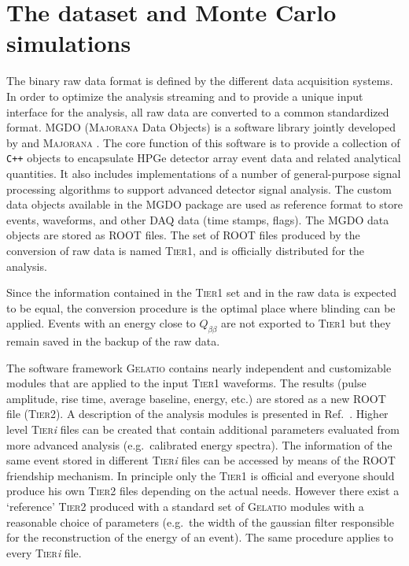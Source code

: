 \chapter{The {\gerda} dataset and Monte Carlo simulations}
 The binary raw data format is defined by the different data acquisition systems. In order to optimize the analysis streaming and to provide a unique input interface for the analysis, all raw data are converted to a common standardized format. MGDO \cite{MGDO} (\textsc{Majorana} {\gerda} Data Objects) is a software library jointly developed by {\gerda} and \textsc{Majorana} \cite{majoranadem}. The core function of this software is to provide a collection of \texttt{C++} objects to encapsulate HPGe detector array event data and related analytical quantities. It also includes implementations of a number of general-purpose signal processing algorithms to support advanced detector signal analysis. The custom data objects available in the MGDO package are used as reference format to store events, waveforms, and other DAQ data (time stamps, flags). The MGDO data objects are stored as ROOT \cite{ROOT} files. The set of ROOT files produced by the conversion of raw data is named \textsc{Tier1}, and is officially distributed for the analysis.

Since the information contained in the \textsc{Tier1} set and in the raw data is expected to be equal, the conversion procedure is the optimal place where blinding can be applied. Events with an energy close to $Q_{\beta\beta}$ are not exported to \textsc{Tier1} but they remain saved in the backup of the raw data.

The software framework \textsc{Gelatio} \cite{GELATIO} contains nearly independent and customizable modules that are applied to the input \textsc{Tier1} waveforms. The results (pulse amplitude, rise time, average baseline, energy, etc.) are stored as a new ROOT file (\textsc{Tier2}). A description of the analysis modules is presented in Ref.~\cite{dataproc}. Higher level \textsc{Tier}\emph{i} files can be created that contain additional parameters evaluated from more advanced analysis (e.g.~calibrated energy spectra). The information of the same event stored in different \textsc{Tier}\emph{i} files can be accessed by means of the ROOT friendship mechanism. In principle only the \textsc{Tier1} is official and everyone should produce his own \textsc{Tier2} files depending on the actual needs. However there exist a `reference' \textsc{Tier2} produced with a standard set of \textsc{Gelatio} modules with a reasonable choice of parameters (e.g.~the width of the gaussian filter responsible for the reconstruction of the energy of an event). The same procedure applies to every \textsc{Tier}\emph{i} file.

